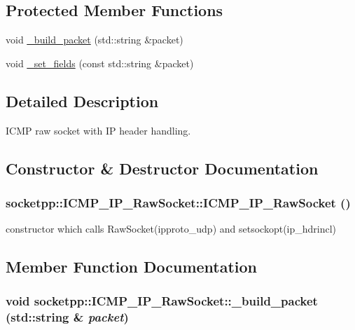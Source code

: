 \subsection*{Protected Member Functions}
\begin{CompactItemize}
\item 
void \hyperlink{classsocketpp_1_1ICMP__IP__RawSocket_49a62078d6febf7a11b9350de1e23903}{\_\-build\_\-packet} (std::string \&packet)
\item 
void \hyperlink{classsocketpp_1_1ICMP__IP__RawSocket_6d2f188d46030afa13f9c3971d43d518}{\_\-set\_\-fields} (const std::string \&packet)
\end{CompactItemize}


\subsection{Detailed Description}
ICMP raw socket with IP header handling. 

\subsection{Constructor \& Destructor Documentation}
\hypertarget{classsocketpp_1_1ICMP__IP__RawSocket_c94fd53fce785a8b9ac5e53c8b1fb694}{
\subsubsection[{ICMP\_\-IP\_\-RawSocket}]{\setlength{\rightskip}{0pt plus 5cm}socketpp::ICMP\_\-IP\_\-RawSocket::ICMP\_\-IP\_\-RawSocket ()}}
\label{classsocketpp_1_1ICMP__IP__RawSocket_c94fd53fce785a8b9ac5e53c8b1fb694}


constructor which calls RawSocket(ipproto\_\-udp) and setsockopt(ip\_\-hdrincl) 



\subsection{Member Function Documentation}
\hypertarget{classsocketpp_1_1ICMP__IP__RawSocket_49a62078d6febf7a11b9350de1e23903}{
\subsubsection[{\_\-build\_\-packet}]{\setlength{\rightskip}{0pt plus 5cm}void socketpp::ICMP\_\-IP\_\-RawSocket::\_\-build\_\-packet (std::string \& {\em packet})}}
\label{classsocketpp_1_1ICMP__IP__RawSocket_49a62078d6febf7a11b9350de1e23903}




